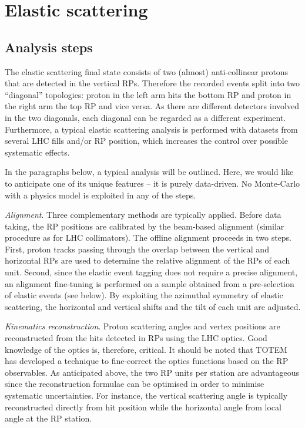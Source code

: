 \documentclass{desyproc}
\begin{document}
\section{Elastic scattering}\label{s:el}

\subsection{Analysis steps}

The elastic scattering final state consists of two (almost) anti-collinear protons that are detected in the vertical RPs. Therefore the recorded events split into two ``diagonal'' topologies: proton in the left arm hits the bottom RP and proton in the right arm the top RP and vice versa. As there are different detectors involved in the two diagonals, each diagonal can be regarded as a different experiment. Furthermore, a typical elastic scattering analysis is performed with datasets from several LHC fills and/or RP position, which increases the control over possible systematic effects.

In the paragraphs below, a typical analysis will be outlined. Here, we would like to anticipate one of its unique features -- it is purely data-driven. No Monte-Carlo with a physics model is exploited in any of the steps.

{\em Alignment}. Three complementary methods are typically applied. Before data taking, the RP positions are calibrated by the beam-based alignment (similar procedure as for LHC collimators). The offline alignment proceeds in two steps. First, proton tracks passing through the overlap between the vertical and horizontal RPs are used to determine the relative alignment of the RPs of each unit. Second, since the elastic event tagging does not require a precise alignment, an alignment fine-tuning is performed on a sample obtained from a pre-selection of elastic events (see below). By exploiting the azimuthal symmetry of elastic scattering, the horizontal and vertical shifts and the tilt of each unit are adjusted.

{\em Kinematics reconstruction}. Proton scattering angles and vertex positions are reconstructed from the hits detected in RPs using the LHC optics. Good knowledge of the optics is, therefore, critical. It should be noted that TOTEM has developed a technique to fine-correct the optics functions based on the RP observables. As anticipated above, the two RP units per station are advantageous since the reconstruction formulae can be optimised in order to minimise systematic uncertainties. For instance, the vertical scattering angle is typically reconstructed directly from hit position while the horizontal angle from local angle at the RP station.
\end{document}
